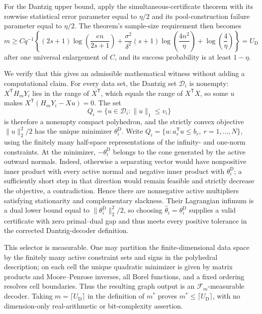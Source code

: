 For the Dantzig upper bound, apply the simultaneous-certificate theorem with its rowwise statistical error parameter equal to \(\eta/2\) and its pool-construction failure parameter equal to \(\eta/2\).  The theorem's sample-size requirement then becomes
\[
 m\ge Cq^{-1}\left\{(2s+1)\log\!\left(\frac{en}{2s+1}\right)
 +\frac{\sigma^2}{\delta^2}(s+1)\log\!\left(\frac{4n^2}{\eta}\right)
 +\log\!\left(\frac4\eta\right)\right\}=U_{\mathrm D} \tag{36}
\]
after one universal enlargement of \(C\), and its success probability is at least \(1-\eta\).

We verify that this gives an admissible mathematical witness without adding a computational claim.  For every data set, the Dantzig set \(\mathcal D_i\) is nonempty: \(X^{\mathsf T}H_mY_i\) lies in the range of \(X^{\mathsf T}\), which equals the range of \(X^{\mathsf T}X\), so some \(u\) makes \(X^{\mathsf T}(H_mY_i-Xu)=0\).  The set
\[
 Q_i=\{u\in\mathcal D_i:\lVert u\rVert_1\le v_i\}
\]
is therefore a nonempty compact polyhedron, and the strictly convex objective \(\lVert u\rVert_2^2/2\) has the unique minimizer \(\theta_i^{\mathrm D}\).  Write \(Q_i=\{u:a_r^{\mathsf T}u\le b_r,\ r=1,\ldots,N\}\), using the finitely many half-space representations of the infinity- and one-norm constraints.  At the minimizer, \(-\theta_i^{\mathrm D}\) belongs to the cone generated by the active outward normals.  Indeed, otherwise a separating vector would have nonpositive inner product with every active normal and negative inner product with \(\theta_i^{\mathrm D}\); a sufficiently short step in that direction would remain feasible and strictly decrease the objective, a contradiction.  Hence there are nonnegative active multipliers satisfying stationarity and complementary slackness.  Their Lagrangian infimum is a dual lower bound equal to \(\lVert\theta_i^{\mathrm D}\rVert_2^2/2\), so choosing \(\widehat\theta_i=\theta_i^{\mathrm D}\) supplies a valid certificate with zero primal--dual gap and thus meets every positive tolerance in the corrected Dantzig-decoder definition.

This selector is measurable.  One may partition the finite-dimensional data space by the finitely many active constraint sets and signs in the polyhedral description; on each cell the unique quadratic minimizer is given by matrix products and Moore--Penrose inverses, all Borel functions, and a fixed ordering resolves cell boundaries.  Thus the resulting graph output is an \(\mathcal F_m\)-measurable decoder.  Taking \(m=\lceil U_{\mathrm D}\rceil\) in the definition of \(m^*\) proves \(m^*\le\lceil U_{\mathrm D}\rceil\), with no dimension-only real-arithmetic or bit-complexity assertion.

